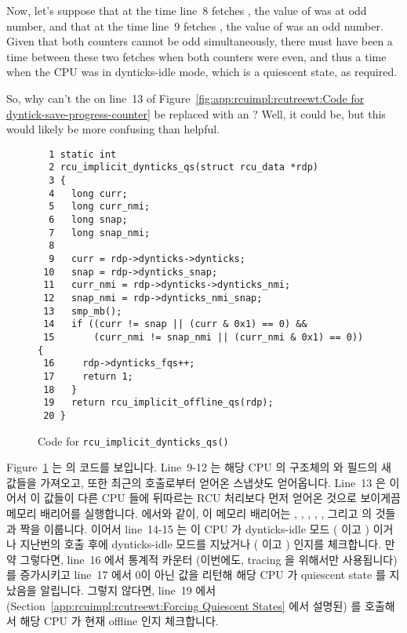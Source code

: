 {	Now, let's suppose that at the time line~8 fetches ,
	the value of  was at odd number, and that at the
	time line~9 fetches , the value of
	 was an odd number.
	Given that both counters cannot be odd simultaneously, there must
	have been a time between these two fetches when both counters
	were even, and thus a time when the CPU was in dynticks-idle
	mode, which is a quiescent state, as required.

	So, why can't the \co{&&} on line~13 of
	Figure~\ref{fig:app:rcuimpl:rcutreewt:Code for dyntick-save-progress-counter}
	be replaced with an \co{==}?
	Well, it could be, but this would likely be more confusing
	than helpful.
	\fi
} \QuickQuizEnd

\begin{figure}[tbp]
{ \scriptsize
\begin{verbatim}
  1 static int
  2 rcu_implicit_dynticks_qs(struct rcu_data *rdp)
  3 {
  4   long curr;
  5   long curr_nmi;
  6   long snap;
  7   long snap_nmi;
  8
  9   curr = rdp->dynticks->dynticks;
 10   snap = rdp->dynticks_snap;
 11   curr_nmi = rdp->dynticks->dynticks_nmi;
 12   snap_nmi = rdp->dynticks_nmi_snap;
 13   smp_mb();
 14   if ((curr != snap || (curr & 0x1) == 0) &&
 15       (curr_nmi != snap_nmi || (curr_nmi & 0x1) == 0)) {
 16     rdp->dynticks_fqs++;
 17     return 1;
 18   }
 19   return rcu_implicit_offline_qs(rdp);
 20 }
\end{verbatim}
}
\caption{Code for {\tt rcu\_\-implicit\_\-dynticks\_\-qs()}}
\label{fig:app:rcuimpl:rcutreewt:Code for rcu-implicit-dynticks-qs}
\end{figure}

Figure~\ref{fig:app:rcuimpl:rcutreewt:Code for rcu-implicit-dynticks-qs}
는  의 코드를 보입니다.
Line~9-12 는 해당 CPU 의  구조체의  와
 필드의 새 값들을 가져오고, 또한 최근의
 호출로부터 얻어온 스냅샷도 얻어옵니다.
Line~13 은 이어서 이 값들이 다른 CPU 들에 뒤따르는 RCU 처리보다 먼저 얻어온
것으로 보이게끔 메모리 배리어를 실행합니다.
 에서와 같이, 이 메모리 배리어는
, , ,
, , 그리고  의 것들과
짝을 이룹니다.
이어서 line~14-15 는 이 CPU 가 dynticks-idle 모드 ( 이고
) 이거나 지난번의 
호출 후에 dynticks-idle 모드를 지났거나 ( 이고 ) 인지를 체크합니다.
만약 그렇다면, line~16 에서  통계적 카운터 (이번에도,
tracing 을 위해서만 사용됩니다) 를 증가시키고 line~17 에서 0이 아닌 값을 리턴해
해당 CPU 가 quiescent state 를 지났음을 알립니다.
그렇지 않다면, line~19 에서
(Section~\ref{app:rcuimpl:rcutreewt:Forcing Quiescent States} 에서 설명된)
 를 호출해서 해당 CPU 가 현재 offline 인지
체크합니다.
\iffalse


